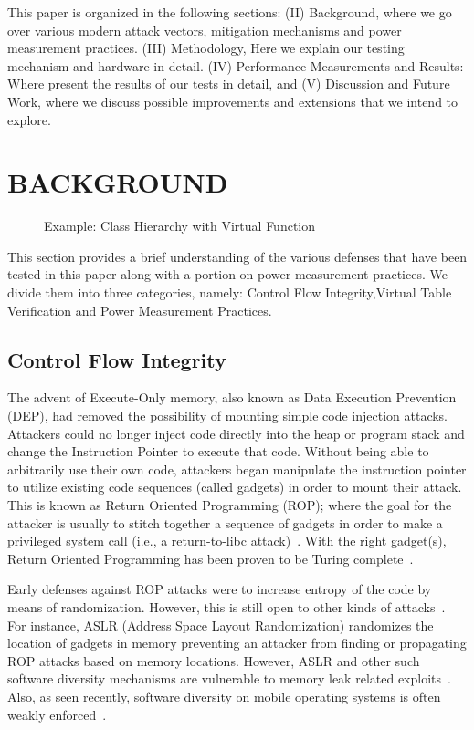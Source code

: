 \documentclass[letterpaper, 10 pt, conference]{ieeeconf}  %
\begin{document}
This paper is organized in the following sections:
(II) Background, where we go over various modern attack vectors, mitigation mechanisms and power measurement practices.
(III) Methodology, Here we explain our testing mechanism and hardware in detail.
(IV) Performance Measurements and Results: Where present the results of our tests in detail, and
(V) Discussion and Future Work, where we discuss possible improvements and extensions that we intend to explore.

\section{BACKGROUND}

\begin{figure}[t]
\label{vtable}

\caption{Example: Class Hierarchy with Virtual Function}
\end{figure}

This section provides a brief understanding of the various defenses that have been tested in this paper along with a portion on power measurement practices. We divide them into three categories, namely: Control Flow Integrity,Virtual Table Verification and Power Measurement Practices.

\subsection{Control Flow Integrity}
The advent of Execute-Only memory, also known as Data Execution Prevention (DEP), had removed the possibility of mounting simple code injection attacks. Attackers could no longer inject code directly into the heap or program stack and change the Instruction Pointer to execute that code. Without being able to arbitrarily use their own code, attackers began manipulate the instruction pointer to utilize existing code sequences (called gadgets) in order to mount their attack. This is known as Return Oriented Programming (ROP); where the goal for the attacker is usually to stitch together a sequence of gadgets in order to make a privileged system call (i.e., a return-to-libc attack)~\cite{gadgets}. With the right gadget(s), Return Oriented Programming has been proven to be Turing complete~\cite{turing}.

Early defenses against ROP attacks were to increase entropy of the code by means of randomization. However, this is still open to other kinds of attacks~\cite{aslr}. For instance, ASLR (Address Space Layout Randomization) randomizes the location of gadgets in memory preventing an attacker from finding or propagating ROP attacks based on memory locations. However, ASLR and other such software diversity mechanisms are vulnerable to memory leak related exploits~\cite{failaslr}. Also, as seen recently, software diversity on mobile operating systems is often weakly enforced~\cite{zygote}.
\end{document}
